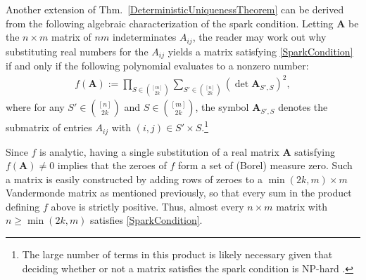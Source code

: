 \documentclass[journal, twocolumn]{IEEEtran}
\begin{document}
Another extension of Thm.~\ref{DeterministicUniquenessTheorem} can be derived from the following algebraic characterization of the spark condition.  Letting $\mathbf{A}$ be the $n \times m$ matrix of $nm$ indeterminates $A_{ij}$, the reader may work out why substituting real numbers for the $A_{ij}$ yields a matrix satisfying \eqref{SparkCondition} if and only if the following polynomial evaluates to a nonzero number:
\begin{align*}
f(\mathbf{A}) := \prod_{S \in {[m] \choose 2k}} \sum_{S' \in {[n] \choose 2k}} (\det \mathbf{A}_{S',S})^2,
\end{align*}
%
where for any $S' \in {[n] \choose 2k}$ and $S \in {[m] \choose 2k}$, the symbol $\mathbf{A}_{S',S}$ denotes the submatrix of entries $A_{ij}$ with $(i,j) \in S' \times S$.\footnote{The large number of terms in this product is likely necessary given that deciding whether or not a matrix satisfies the spark condition is NP-hard \cite{tillmann2014computational}.}

Since $f$ is analytic, having a single substitution of a real matrix $\mathbf{A}$ satisfying $f(\mathbf{A}) \neq 0$ implies that the zeroes of $f$ form a set of (Borel) measure zero. Such a matrix is easily constructed by adding rows of zeroes to a $\min(2k,m) \times m$ Vandermonde matrix as mentioned previously, so that every sum in the product defining $f$ above is strictly positive. Thus, almost every $n \times m$ matrix with $n \geq \min(2k,m)$ satisfies \eqref{SparkCondition}.

%

\end{document}
